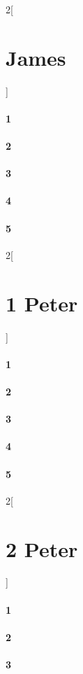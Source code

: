 \documentclass{book}
\begin{document}
\begin{multicols}{2}[\part{James}]
\subsection*{1}
\subsection*{2}
\subsection*{3}
\subsection*{4}
\subsection*{5}
\end{multicols}
\begin{multicols}{2}[\part{1 Peter}]
\subsection*{1}
\subsection*{2}
\subsection*{3}
\subsection*{4}
\subsection*{5}
\end{multicols}
\begin{multicols}{2}[\part{2 Peter}]
\subsection*{1}
\subsection*{2}
\subsection*{3}
\end{multicols}
\end{document}
